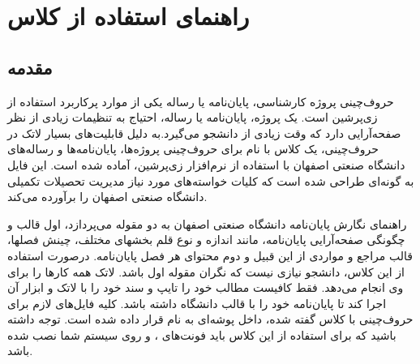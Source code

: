 \chapter{راهنمای استفاده از کلاس}
\section{مقدمه}
حروف‌چینی پروژه کارشناسی، پایان‌نامه یا رساله یکی از موارد پرکاربرد استفاده از زی‌پرشین\cite{Khalighi87xepersian} است.  یک پروژه، پایان‌نامه یا رساله،  احتیاج به تنظیمات زیادی از نظر صفحه‌آرایی  دارد که وقت زیادی از دانشجو می‌گیرد.به دلیل قابلیت‌های بسیار لاتک در حروف‌چینی، یک کلاس با نام 
برای حروف‌چینی پروژه‌ها، پایان‌نامه‌ها و رساله‌های دانشگاه صنعتی اصفهان با استفاده از نرم‌افزار زی‌پرشین،  آماده شده است. این فایل به 
گونه‌ای طراحی شده است که کلیات خواسته‌های مورد نیاز  مدیریت تحصیلات تکمیلی دانشگاه صنعتی اصفهان \cite{IUTThesisGuide} را برآورده می‌کند.%

راهنمای نگارش پایان‌نامه دانشگاه صنعتی اصفهان به دو مقوله می‌پردازد، اول قالب و چگونگی صفحه‌آرایی پایان‌نامه، مانند اندازه و نوع قلم بخشهای مختلف، چینش فصلها، قالب مراجع و مواردی از این قبیل و دوم محتوای هر فصل پایان‌نامه. 
درصورت استفاده از این کلاس، دانشجو  نیازی نیست که نگران مقوله اول باشد. لاتک همه کارها را برای وی انجام می‌دهد. فقط کافیست مطالب خود را تایپ و سند خود را با لاتک و ابزار آن اجرا کند تا پایان‌نامه خود را با قالب دانشگاه داشته باشد.
کلیه فایل‌های لازم برای حروف‌چینی با کلاس گفته شده، داخل پوشه‌ای به نام
قرار داده شده است. توجه داشته باشید که برای استفاده از این کلاس باید فونت‌های
،
و
روی سیستم شما نصب شده باشد.
